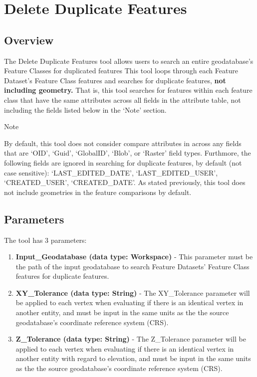 \documentclass[openany]{book}
\providecommand{\tightlist}{%
  \setlength{\itemsep}{0pt}\setlength{\parskip}{0pt}}
\theoremstyle{definition}
\theoremstyle{definition}
\theoremstyle{definition}
\theoremstyle{remark}
\let\BeginKnitrBlock\begin \let\EndKnitrBlock\end
\begin{document}
\chapter{Delete Duplicate Features}\label{delFeats}

\section{Overview}\label{overview-6}

The Delete Duplicate Features tool allows users to search an entire
geodatabase's Feature Classes for duplicated features This tool loops
through each Feature Dataset's Feature Class features and searches for
duplicate features, \textbf{not including geometry.} That is, this tool
searches for features within each feature class that have the same
attributes across all fields in the attribute table, not including the
fields listed below in the `Note' section.

\BeginKnitrBlock{warnh1}
Note
\EndKnitrBlock{warnh1} \BeginKnitrBlock{warnp}

By default, this tool does not consider compare attributes in across any
fields that are `OID', `Guid', `GlobalID', `Blob', or `Raster' field
types. Furthmore, the following fields are ignored in searching for
duplicate features, by default (not case sensitive):
`LAST\_EDITED\_DATE', `LAST\_EDITED\_USER', `CREATED\_USER',
`CREATED\_DATE'. As stated previously, this tool does not include
geometries in the feature comparisons by default.
\EndKnitrBlock{warnp}

\section{Parameters}\label{parameters-6}

The tool has 3 parameters:

\begin{enumerate}
\def\labelenumi{\arabic{enumi}.}
\tightlist
\item
  \textbf{Input\_Geodatabase (data type: Workspace)} - This parameter
  must be the path of the input geodatabase to search Feature Datasets'
  Feature Class features for duplicate features.
\item
  \textbf{XY\_Tolerance (data type: String)} - The XY\_Tolerance
  parameter will be applied to each vertex when evaluating if there is
  an identical vertex in another entity, and must be input in the same
  units as the the source geodatabase's coordinate reference system
  (CRS).
\item
  \textbf{Z\_Tolerance (data type: String)} - The Z\_Tolerance parameter
  will be applied to each vertex when evaluating if there is an
  identical vertex in another entity with regard to elevation, and must
  be input in the same units as the the source geodatabase's coordinate
  reference system (CRS).
\end{enumerate}
\end{document}
